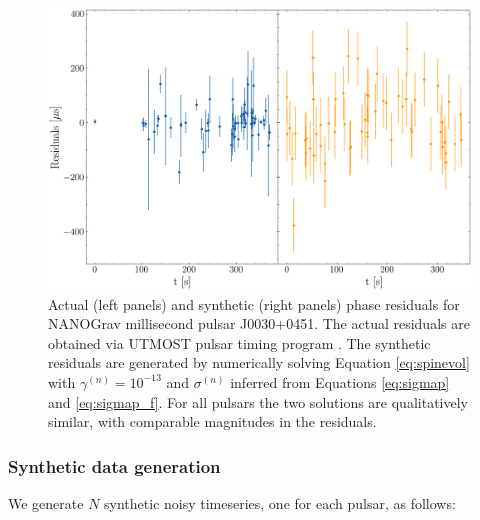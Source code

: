 \documentclass[fleqn,usenatbib,useAMS]{mnras}
\begin{document}
\begin{figure}
	\includegraphics[width=\columnwidth]{images/example_residuals_plot}
	\caption{Actual (left panels) and synthetic (right panels) phase residuals for NANOGrav millisecond pulsar J0030+0451. The actual residuals are obtained via UTMOST pulsar timing program \citep{UTMOST}. The synthetic residuals are generated by numerically solving Equation \eqref{eq:spinevol} with $\gamma^{(n)} = 10^{-13}$ and $\sigma^{(n)}$ inferred from Equations \eqref{eq:sigmap} and \eqref{eq:sigmap_f}. For all pulsars the two solutions are qualitatively similar, with comparable magnitudes in the residuals. }
	\label{fig:qualitative_compare}
\end{figure}
\subsubsection{Synthetic data generation}
We generate $N$ synthetic noisy timeseries, one for each pulsar, as follows:
\end{document}
